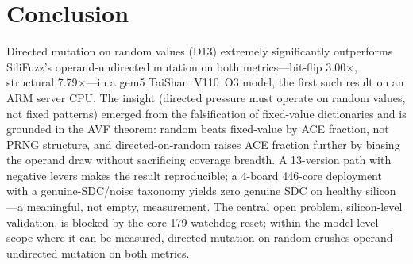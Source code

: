 \documentclass[sigplan,review,anonymous]{acmart}
\begin{document}
\section{Conclusion}
\label{sec:concl}
Directed mutation on random values (D13) extremely significantly outperforms SiliFuzz's operand-undirected mutation on both metrics---bit-flip 3.00$\times$, structural 7.79$\times$---in a gem5 TaiShan~V110~O3 model, the first such result on an ARM server CPU. The insight (directed pressure must operate on random values, not fixed patterns) emerged from the falsification of fixed-value dictionaries and is grounded in the AVF theorem: random beats fixed-value by ACE fraction, not PRNG structure, and directed-on-random raises ACE fraction further by biasing the operand draw without sacrificing coverage breadth. A 13-version path with negative levers makes the result reproducible; a 4-board 446-core deployment with a genuine-SDC/noise taxonomy yields zero genuine SDC on healthy silicon---a meaningful, not empty, measurement. The central open problem, silicon-level validation, is blocked by the core-179 watchdog reset; within the model-level scope where it can be measured, directed mutation on random crushes operand-undirected mutation on both metrics.

\begin{acks}
[To be completed.]
\end{acks}



\end{document}
